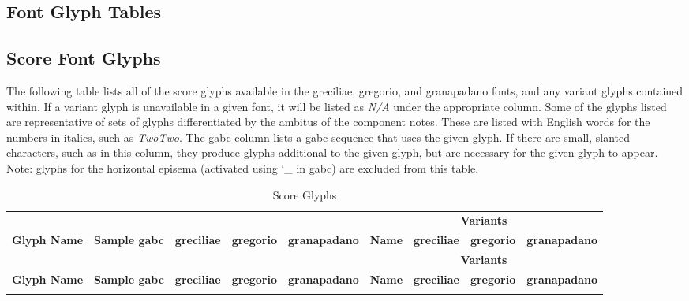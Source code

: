 \begin{landscape}

\section{Font Glyph Tables}\label{glyphtable}

\subsection{Score Font Glyphs}

The following table lists all of the score glyphs available in the greciliae,
gregorio, and granapadano fonts, and any variant glyphs contained within.  If a
variant glyph is unavailable in a given font, it will be listed as
{\itshape\small N/A} under the appropriate column.  Some of the glyphs listed
are representative of sets of glyphs differentiated by the ambitus of the
component notes.  These are listed with English words for the numbers in
italics, such as {\itshape TwoTwo}.  The gabc column lists a gabc sequence that
uses the given glyph.  If there are small, slanted characters, such as
 in this column, they produce glyphs additional to the given
glyph, but are necessary for the given glyph to appear.  Note: glyphs for the
horizontal episema (activated using {\ttfamily\char`_} in gabc) are excluded from
this table.

\newcommand\ScoreFontTable[1]{%
	\begin{longtable}{llccccccc}
			\caption{Score Glyphs}\\
			&&&&&\multicolumn{4}{c}{\bfseries Variants}\\
			\hhline{>{\arrayrulecolor{lightgray}}----->{\arrayrulecolor{black}}----}
			{\bfseries Glyph Name}&%
			{\scriptsize\bfseries Sample gabc}&%
			{\scriptsize\bfseries greciliae}&%
			{\scriptsize\bfseries gregorio}&%
			{\scriptsize\bfseries granapadano}&%
			{\scriptsize\bfseries Name}&%
			{\scriptsize\bfseries greciliae}&%
			{\scriptsize\bfseries gregorio}&%
			{\scriptsize\bfseries granapadano}\\
			\hline
		\endfirsthead
			&&&&&\multicolumn{4}{c}{\bfseries Variants}\\
			\hhline{>{\arrayrulecolor{lightgray}}----->{\arrayrulecolor{black}}----}
			{\bfseries Glyph Name}&%
			{\scriptsize\bfseries Sample gabc}&%
			{\scriptsize\bfseries greciliae}&%
			{\scriptsize\bfseries gregorio}&%
			{\scriptsize\bfseries granapadano}&%
			{\scriptsize\bfseries Name}&%
			{\scriptsize\bfseries greciliae}&%
			{\scriptsize\bfseries gregorio}&%
			{\scriptsize\bfseries granapadano}\\
			\hline
		\endhead
		\directlua{GregorioRef.emit_score_glyphs(#1)}
	\end{longtable}
}%
\ScoreFontTable{'greciliae','gregorio','granapadano'}


\end{landscape}
